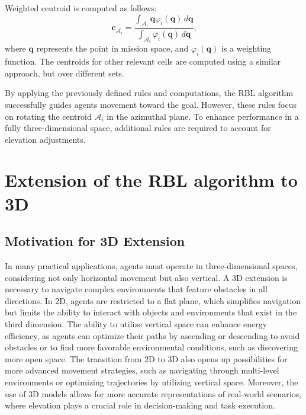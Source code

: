         Weighted centroid is computed as follows:        
        \begin{equation}
            \mathbf{c}_{\mathcal{A}_i} = \frac{\int_{\mathcal{A}_i} \mathbf{q} \varphi_i(\mathbf{q}) \, d\mathbf{q}}{\int_{\mathcal{A}_i} \varphi_i(\mathbf{q}) \, d\mathbf{q}}\text{,}
        \end{equation}
        where \( \mathbf{q} \) represents the point in mission space, and \( \varphi_i(\mathbf{q}) \) is a weighting function. 
        The centroids for other relevant cells are computed using a similar approach, but over different sets.

        By applying the previously defined rules and computations, the RBL algorithm successfully guides agents movement toward the goal.
        However, these rules focus on rotating the centroid $\mathcal{A}_i$ in the azimuthal plane. 
        To enhance performance in a fully three-dimensional space, additional rules are required to account for elevation adjustments. 

\section{Extension of the RBL algorithm to 3D}
    \subsection{Motivation for 3D Extension}
        In many practical applications, agents must operate in three-dimensional spaces, considering not only horizontal movement but also vertical.
        A 3D extension is necessary to navigate complex environments that feature obstacles in all directions.
        In 2D, agents are restricted to a flat plane, which simplifies navigation but limits the ability to interact with objects and environments that exist in the third dimension.
        The ability to utilize vertical space can enhance energy efficiency, as agents can optimize their paths by ascending or descending to avoid obstacles or to find more favorable environmental conditions, such as discovering more open space.
        The transition from 2D to 3D also opens up possibilities for more advanced movement strategies, such as navigating through multi-level environments or optimizing trajectories by utilizing vertical space.  
        Moreover, the use of 3D models allows for more accurate representations of real-world scenarios, where elevation plays a crucial role in decision-making and task execution.


